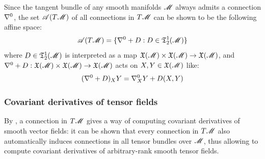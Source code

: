 Since the tangent bundle of any smooth manifolds $ \mathscr{M} $ always admits a connection $ \nabla^0 $, the set $ \mathscr{A}(T\mathscr{M}) $ of all connections in $ T\mathscr{M} $ can be shown to be the following affine space:
\begin{equation}
  \mathscr{A}(T\mathscr{M}) = \{ \nabla^0 + D : D \in \mathfrak{T}^{1}_{2}(\mathscr{M}) \}
\end{equation}
where $ D \in \mathfrak{T}^{1}_{2}(\mathscr{M}) $ is interpreted as a map $ \mathfrak{X}(\mathscr{M}) \times \mathfrak{X}(\mathscr{M}) \rightarrow \mathfrak{X}(\mathscr{M}) $, and $ \nabla^0 + D : \mathfrak{X}(\mathscr{M}) \times \mathfrak{X}(\mathscr{M}) \rightarrow \mathfrak{X}(\mathscr{M}) $ acts on $ X,Y \in \mathfrak{X}(\mathscr{M}) $ like:
\begin{equation*}
  (\nabla^0 + D)_X Y = \nabla^0_X Y + D(X,Y)
\end{equation*}

\subsubsection{Covariant derivatives of tensor fields}

By , a connection in $ T\mathscr{M} $ gives a way of computing covariant derivatives of smooth vector fields: it can be shown that every connection in $ T\mathscr{M} $ also automatically induces connections in all tensor bundles over $ \mathscr{M} $, thus allowing to compute covariant derivatives of arbitrary-rank smooth tensor fields.

